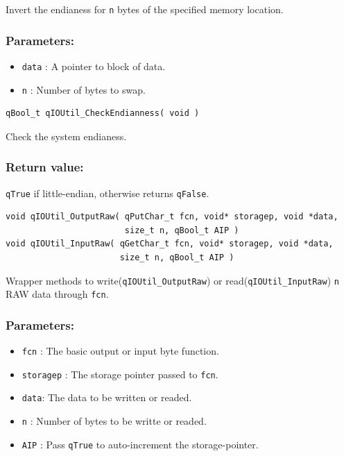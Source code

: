 \documentclass{article}
\begin{document}
Invert the endianess for \lstinline{n} bytes of the specified memory location. 

\subsubsection*{Parameters:}
\begin{itemize}
    \item \lstinline{data} : A pointer to block of data.
    \item \lstinline{n} : Number of bytes to swap.
\end{itemize}

\noindent\hrulefill

\begin{lstlisting}[style=CStyle]
qBool_t qIOUtil_CheckEndianness( void )
\end{lstlisting}

Check the system endianess. 

\subsubsection*{Return value:}
\lstinline{qTrue} if little-endian, otherwise returns \lstinline{qFalse}.

\noindent\hrulefill

\begin{lstlisting}[style=CStyle]
void qIOUtil_OutputRaw( qPutChar_t fcn, void* storagep, void *data, 
                        size_t n, qBool_t AIP )
void qIOUtil_InputRaw( qGetChar_t fcn, void* storagep, void *data, 
                       size_t n, qBool_t AIP )
\end{lstlisting}

Wrapper methods to write(\lstinline{qIOUtil_OutputRaw})  or read(\lstinline{qIOUtil_InputRaw})  \lstinline{n} RAW data through \lstinline{fcn}.

\subsubsection*{Parameters:}
\begin{itemize}
    \item \lstinline{fcn} : The basic output or input byte function.
    \item \lstinline{storagep} : The storage pointer passed to \lstinline{fcn}.
    \item \lstinline{data}: The data to be written or readed.
    \item \lstinline{n} : Number of bytes to be writte or readed.
    \item \lstinline{AIP} : Pass \lstinline{qTrue} to auto-increment the storage-pointer.
\end{itemize}
\end{document}
